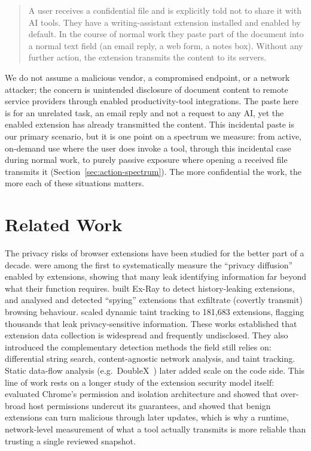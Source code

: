 \documentclass[10pt,conference,a4paper]{IEEEtran}
\begin{document}
\begin{quote}
A user receives a confidential file and is explicitly told not to share it with AI
tools. They have a writing-assistant extension installed and enabled by default. In the
course of normal work they paste part of the
document into a normal text field (an email reply, a web form, a notes box). Without
any further action, the extension transmits the content to its servers.
\end{quote}

We do not assume a malicious vendor, a compromised endpoint, or a network attacker; the
concern is unintended disclosure of document content to remote service providers through
enabled productivity-tool integrations. The paste here is for an unrelated task, an email
reply and not a request to any AI, yet the enabled extension has already transmitted the
content. This incidental paste is our primary scenario, but it is one point on a spectrum we
measure: from active, on-demand use where the user does invoke a tool, through this
incidental case during normal work, to purely passive exposure where opening a
received file transmits it (Section~\ref{sec:action-spectrum}). The more confidential the
work, the more each of these situations matters.

\section{Related Work}
\label{sec:related}

The privacy risks of browser extensions have been studied for the better part of a
decade. \citet{starov2017extended} were among the first to systematically measure the
``privacy diffusion'' enabled by extensions, showing that many leak identifying
information far beyond what their function requires. \citet{weissbacher2017exray}
built Ex-Ray to detect history-leaking extensions, and \citet{aggarwal2018ispy}
analysed and detected ``spying'' extensions that exfiltrate (covertly transmit) browsing
behaviour.
\citet{chen2018mystique} scaled dynamic taint tracking to 181{,}683 extensions,
flagging thousands that leak privacy-sensitive information. These works established
that extension data collection is widespread and frequently undisclosed. They also
introduced the complementary detection methods the field still relies on: differential
string search, content-agnostic network analysis, and taint tracking. Static data-flow
analysis (e.g.\ DoubleX~\citep{fass2021doublex}) later added scale on the code side. This line of work rests on a longer study of the extension
security model itself: \citet{carlini2012chrome} evaluated Chrome's permission and
isolation architecture and showed that over-broad host permissions undercut its
guarantees, and \citet{pantelaios2020changed} showed that benign extensions can turn
malicious through later updates, which is why a runtime, network-level measurement of
what a tool actually transmits is more reliable than trusting a single reviewed
snapshot.
\end{document}
